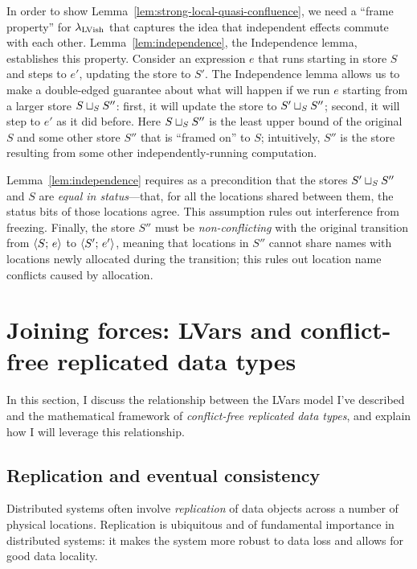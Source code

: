 \documentclass{article}
\begin{document}
\LemStrongLocalQuasiConfluence

\noindent In order to show
Lemma~\ref{lem:strong-local-quasi-confluence}, we need a ``frame
property'' for $\lambda_{\textrm{LVish}}$ that captures the idea that independent
effects commute with each other.  Lemma~\ref{lem:independence}, the
Independence lemma, establishes this property.  Consider an expression
$e$ that runs starting in store $S$ and steps to $e'$, updating the
store to $S'$.  The Independence lemma allows us to make a
double-edged guarantee about what will happen if we run $e$ starting
from a larger store $S \sqcup_{S} S''$: first, it will update the
store to $S' \sqcup_{S} S''$; second, it will step to $e'$ as it did
before.  Here $S \sqcup_{S} S''$ is the least upper bound of the
original $S$ and some other store $S''$ that is ``framed on'' to $S$;
intuitively, $S''$ is the store resulting from some other
independently-running computation.

\LemIndependence

\noindent Lemma~\ref{lem:independence} requires as a precondition that
the stores $S' \sqcup_{S} S''$ and $S$ are \emph{equal in
  status}---that, for all the locations shared between them, the
status bits of those locations agree.  This assumption rules out
interference from freezing.  Finally, the store $S''$ must be
\emph{non-conflicting} with the original transition from
$\langle S;\, e \rangle$ to $\langle S';\, e' \rangle$, meaning that locations in $S''$
cannot share names with locations newly allocated during the
transition; this rules out location name conflicts caused by
allocation.

\DefEqualStatus

\DefNonConflicting

\section{Joining forces: LVars and conflict-free replicated data types}\label{s:crdts}

In this section, I discuss the relationship between the LVars model
I've described and the mathematical framework of \emph{conflict-free
  replicated data types}, and explain how I will leverage this
relationship.

\subsection{Replication and eventual consistency}

Distributed systems often involve \emph{replication} of data objects
across a number of physical locations.  Replication is ubiquitous and
of fundamental importance in distributed systems: it makes the system
more robust to data loss and allows for good data locality.
\end{document}
